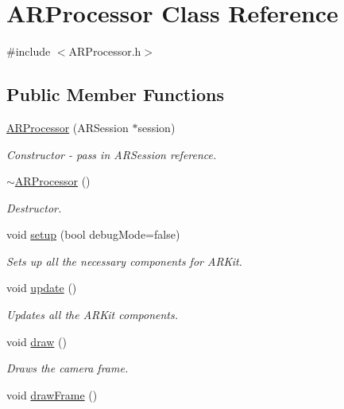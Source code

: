 \hypertarget{class_a_r_processor}{}\section{A\+R\+Processor Class Reference}
\label{class_a_r_processor}


{\ttfamily \#include $<$A\+R\+Processor.\+h$>$}

\subsection*{Public Member Functions}
\begin{DoxyCompactItemize}
\item 
\mbox{\hyperlink{class_a_r_processor_a2dda14173a82870379c111d13a0562d6}{A\+R\+Processor}} (A\+R\+Session $\ast$session)
\begin{DoxyCompactList}\small\item\em Constructor -\/ pass in A\+R\+Session reference. \end{DoxyCompactList}\item 
\mbox{\hyperlink{class_a_r_processor_a9bd83aa6f017e308d1e55e709621ae84}{$\sim$\+A\+R\+Processor}} ()
\begin{DoxyCompactList}\small\item\em Destructor. \end{DoxyCompactList}\item 
void \mbox{\hyperlink{class_a_r_processor_a1a41547daccb7c6810bc2693ea6d5487}{setup}} (bool debug\+Mode=false)
\begin{DoxyCompactList}\small\item\em Sets up all the necessary components for A\+R\+Kit. \end{DoxyCompactList}\item 
void \mbox{\hyperlink{class_a_r_processor_a76b6cbb62dcc0aa87e38e48cc8dbe621}{update}} ()
\begin{DoxyCompactList}\small\item\em Updates all the A\+R\+Kit components. \end{DoxyCompactList}\item 
void \mbox{\hyperlink{class_a_r_processor_a20418bd305702c3346a109da9e1afcb0}{draw}} ()
\begin{DoxyCompactList}\small\item\em Draws the camera frame. \end{DoxyCompactList}\item 
void \mbox{\hyperlink{class_a_r_processor_a685469fa6b66b8b5d935f6f45a2ef599}{draw\+Frame}} ()

\end{DoxyCompactItemize}
